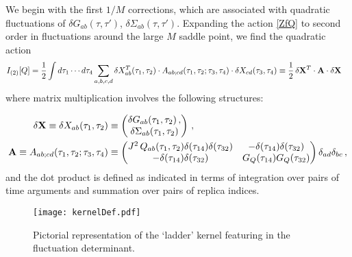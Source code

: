 \documentclass[aps,prx,preprint,onecolumn,citeautoscript,superscriptaddress,nofootinbib,
eqsecnum]{revtex4}
\begin{document}
We begin with the first $1/M$ corrections, which are associated with quadratic fluctuations of $\delta G_{ab} (\tau, \tau')$, $\delta \Sigma_{ab} (\tau, \tau')$. Expanding the action \eqref{ZfQ} to second order in fluctuations around the large $M$ saddle point, we find the quadratic action
\begin{equation}
\label{eq:fluctInt}
\begin{split}
  &I_{(2)}[Q] 
  = \frac{1}{2} \int d\tau_1 \cdots d\tau_4 \sum_{a,b,c,d}\delta X^T_{ab}(\tau_1,\tau_2) \cdot A_{ab;cd}(\tau_1,\tau_2;\tau_3,\tau_4) \cdot \delta X_{cd} (\tau_3,\tau_4) 
  \equiv \frac{1}{2} \, \delta {\bf X}^T \cdot {\bf A} \cdot \delta {\bf X}
  \end{split}
 \end{equation}
 where matrix multiplication involves the following structures:
 {\small
 \begin{equation}
 \label{eq:flucts}
 \begin{split}
 \delta {\bf X} \equiv \delta X_{ab}(\tau_1,\tau_2) &\equiv \begin{pmatrix} \delta G_{ab}(\tau_1,\tau_2)  \,,\\
 \delta \Sigma_{ab}(\tau_1,\tau_2)  
 \end{pmatrix}
\,, \\
{\bf A} \equiv A_{ab;cd}(\tau_1,\tau_2;\tau_3,\tau_4) &\equiv       
 \begin{pmatrix} J^2  \, Q_{ab}(\tau_1,\tau_2) \delta(\tau_{14}) \delta(\tau_{32})
 & - \delta(\tau_{14})\delta(\tau_{32})  \\
  -\delta(\tau_{14})\delta(\tau_{32})
  &  G_Q(\tau_{14}) G_Q(\tau_{32})
 \end{pmatrix} \delta_{ad}\delta_{bc} \,,
 \end{split}
\end{equation} 
and the dot product is defined as indicated in terms of integration over pairs of time arguments and summation over pairs of replica indices.
%
\begin{figure}
    \centering
    \texttt{[image: kernelDef.pdf]}
    \caption{Pictorial representation of the `ladder' kernel featuring in the fluctuation determinant.}
    \label{fig:diagrams0}
\end{figure}
%


}
\end{document}
